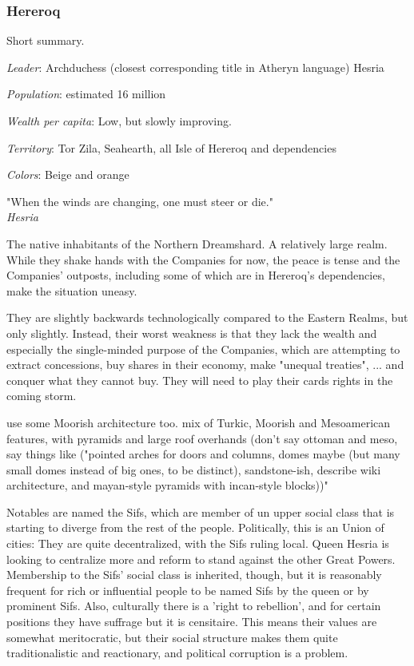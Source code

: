 \subsubsection{Hereroq}


Short summary.


\textit{Leader}: Archduchess (closest corresponding title in Atheryn language) Hesria

\textit{Population}: estimated 16 million

\textit{Wealth per capita}: Low, but slowly improving.

\textit{Territory}: Tor Zila, Seahearth, all Isle of Hereroq and dependencies
    
\textit{Colors}: Beige and orange


\begin{rpg-quotebox}
    "When the winds are changing, one must steer or die." \\ \textendash \textit{Hesria}
    \end{rpg-quotebox}


The native inhabitants of the Northern Dreamshard. A relatively large realm. While they shake hands with the Companies for now, the peace is tense and the Companies' outposts, including some of which are in Hereroq's dependencies, make the situation uneasy.


They are slightly backwards technologically compared to the Eastern Realms, but only slightly. Instead, their worst weakness is that they lack the wealth and especially the single-minded purpose of the Companies, which are attempting to extract concessions, buy shares in their economy, make "unequal treaties", ... and conquer what they cannot buy. They will need to play their cards rights in the coming storm. 

use some Moorish architecture too. mix of Turkic, Moorish and Mesoamerican features, with pyramids and large roof overhands (don't say ottoman and meso, say things like ("pointed arches for doors and columns, domes maybe (but many small domes instead of big ones, to be distinct), sandstone-ish, describe wiki architecture, and mayan-style pyramids with incan-style blocks))"

Notables are named the Sifs, which are member of un upper social class that is starting to diverge from the rest of the people. Politically, this is an Union of cities: They are quite decentralized, with the Sifs ruling local. Queen Hesria is looking to centralize more and reform to stand against the other Great Powers. Membership to the Sifs' social class is inherited, though, but it is reasonably frequent for rich or influential people to be named Sifs by the queen or by prominent Sifs. Also, culturally there is a 'right to rebellion', and for certain positions they have suffrage but it is censitaire. This means their values are somewhat meritocratic, but their social structure makes them quite traditionalistic and reactionary, and political corruption is a problem.

